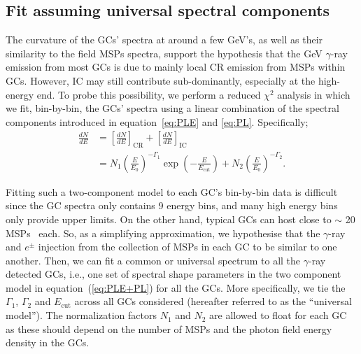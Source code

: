 \documentclass[doublespace,draft,nopageskip]{VTthesis} %
\begin{document}
\subsection{Fit assuming universal spectral components}\label{sec:spectra_global}

The curvature of the GCs' spectra at around a few GeV's, as well as their similarity to the field MSPs spectra, support the hypothesis that the GeV $\gamma$-ray emission from most GCs is due to mainly local CR emission from MSPs within GCs. However, IC may still contribute sub-dominantly, especially at the high-energy end. To probe this possibility, we perform a reduced $\chi^2$ analysis in which we fit, bin-by-bin, the  GCs' spectra using a linear combination of the spectral components introduced in equation~\ref{eq:PLE} and \ref{eq:PL}. Specifically;
\begin{align}\label{eq:PLE+PL}
    \frac{dN}{dE} &= \left[ \frac{dN}{dE} \right]_\mathrm{CR} + \left[ \frac{dN}{dE} \right]_\mathrm{IC} \\\nonumber
    &= N_1\left( \frac{E}{E_0} \right)^{-\Gamma_1}\exp\left(-\frac{E}{E_\mathrm{cut}}\right) + N_2\left(\frac{E}{E_0}\right)^{-\Gamma_2}.
\end{align}

Fitting such a two-component model to each GC's bin-by-bin data is difficult since the GC spectra only contains 9 energy bins, and many high energy bins only provide upper limits. On the other hand, typical GCs can host close to $\sim$ 20 MSPs~\citep{2019ApJ...877..122Y} each. So, as a simplifying approximation, we hypothesise that the $\gamma$-ray and $e^\pm$ injection from the collection of MSPs in each GC to be similar to one another. Then, we can fit a common or universal spectrum to all the $\gamma$-ray detected GCs, i.e., one set of spectral shape parameters in the two component model in equation~(\ref{eq:PLE+PL}) for all the GCs. More specifically, we tie the $\Gamma_1$, $\Gamma_2$ and $E_\mathrm{cut}$ across all GCs considered (hereafter referred to as the ``universal model''). The normalization factors $N_1$ and $N_2$ are allowed to float for each GC as these should depend on the number of MSPs and the photon field energy density in the GCs.
\end{document}
